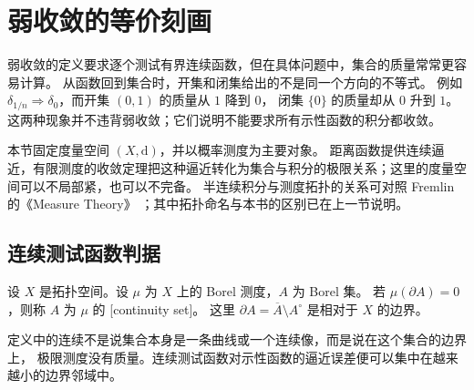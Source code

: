 \section{弱收敛的等价刻画}
\label{b1:sec:1202}

弱收敛的定义要求逐个测试有界连续函数，但在具体问题中，集合的质量常常更容易计算。
从函数回到集合时，开集和闭集给出的不是同一个方向的不等式。
例如 \(\delta_{1/n}\Rightarrow\delta_0\)，而开集 \((0,1)\) 的质量从 \(1\) 降到 \(0\)，
闭集 \(\{0\}\) 的质量却从 \(0\) 升到 \(1\)。
这两种现象并不违背弱收敛；它们说明不能要求所有示性函数的积分都收敛。

\ProseParagraphBreak

本节固定度量空间 \((X,\mathrm{d})\)，并以概率测度为主要对象。
距离函数提供连续逼近，有限测度的收敛定理把这种逼近转化为集合与积分的极限关系；这里的度量空间可以不局部紧，也可以不完备。
半连续积分与测度拓扑的关系可对照 Fremlin 的《Measure Theory》%
\cite[437J(f)--(g) and 437K]{Fremlin2016Measure}；其中拓扑命名与本书的区别已在上一节说明。

\subsection{连续测试函数判据}
\label{b1:subsec:120201}

\begin{definition}\label{b1:def:measure-continuity-set}
设 \(X\) 是拓扑空间。设 \(\mu\) 为 \(X\) 上的 Borel 测度，\(A\) 为 Borel 集。
若 \(\mu(\partial A)=0\)，则称 \(A\) 为 \(\mu\) 的%
[continuity set]。
这里 \(\partial A=\overline A\setminus A^\circ\) 是相对于 \(X\) 的边界。
\end{definition}

定义中的连续不是说集合本身是一条曲线或一个连续像，而是说在这个集合的边界上，
极限测度没有质量。连续测试函数对示性函数的逼近误差便可以集中在越来越小的边界邻域中。


